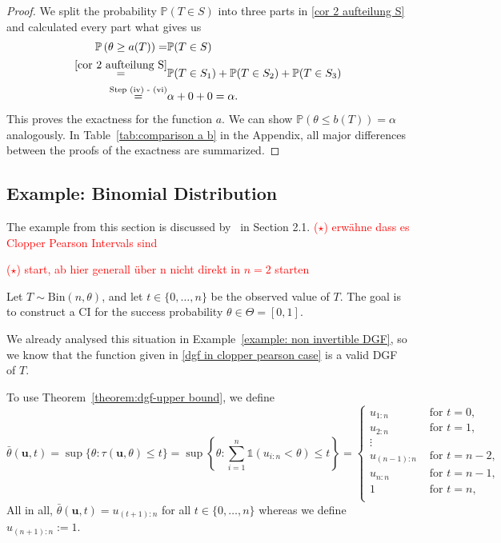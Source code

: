 \begin{proof}
	We split the probability $\mathbb{P} (T \in S)$ into three parts in \eqref{cor 2 aufteilung S} and calculated every part what gives us
	\begin{align*}
		\mathbb{P} \left( \theta \geq a(T) \right)
		=&
		\mathbb{P} (T \in S)  \\
		\overset{\eqref{cor 2 aufteilung S}}{=} &
		\mathbb{P} (T \in S_1) + \mathbb{P} (T \in S_2) + \mathbb{P} (T \in S_3) \\
		\overset{\text{Step (iv) - (vi)}}{=} &
		\alpha + 0 + 0
		=
		\alpha.
	\end{align*}
	This proves the exactness for the function $a$. We can show $\mathbb{P} \left( \theta \leq b(T) \right) = \alpha$ analogously. In Table~\ref{tab:comparison a b} in the Appendix, all major differences between the proofs of the exactness are summarized.
\end{proof}	


\subsection{Example: Binomial Distribution}

The example from this section is discussed by~\cite{Lindqvist2025simulated} in Section 2.1.
\textcolor{red}{($\star$) erwähne dass es Clopper Pearson Intervals sind }

\textcolor{red}{($\star$) start, ab hier generall über n nicht direkt in $n = 2$ starten}


Let \(T \sim \mathrm{Bin}(n,\theta)\), and let \(t \in \{0,\ldots,n\}\) be the observed value of \(T\). The goal is to construct a CI for the success probability \(\theta \in \Theta=[0,1]\).

We already analysed this situation in Example~\ref{example: non invertible DGF}, so we know that the function given in \eqref{dgf in clopper pearson case} is a valid DGF of $T$. 

To use Theorem~\ref{theorem:dgf-upper bound}, we define
\[
\bar \theta (\mathbf u, t) 
=
\sup \{ \theta : \tau(\mathbf u, \theta) \leq t \}
=
\sup \left\{ \theta : \sum_{i = 1}^n \mathds{1}(u_{i:n} < \theta) \leq t \right\}
=
\begin{cases}
	u_{1:n} &\text{ for } t = 0, \\
	u_{2:n} &\text{ for } t = 1, \\
	\vdots & \\
	u_{(n-1):n} &\text{ for } t = n-2, \\
	u_{n:n} &\text{ for } t = n-1, \\
	1 &\text{ for } t = n, \\
\end{cases}
\]
All in all, $\bar \theta (\mathbf u, t) = u_{(t+1):n}$ for all $t \in \{0, \ldots , n\}$ whereas we define $u_{(n+1):n} := 1$.



